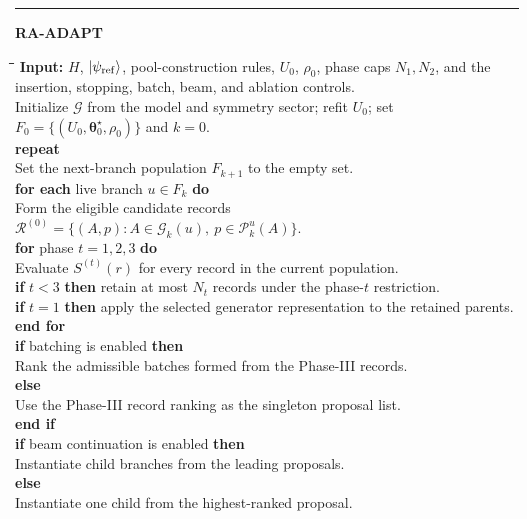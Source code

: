 \documentclass[
  reprint,
  amsmath,
  amssymb,
  aps,
  pra,
  nofootinbib,
  superscriptaddress,
  floatfix
]{revtex4-2}
\newcommand{\ket}[1]{|#1\rangle}
\begin{document}
\begin{widetext}
\footnotesize
\noindent\rule{\textwidth}{0.4pt}
\textbf{RA-ADAPT}
\begin{tabbing}
\hspace{1.5em}\=\hspace{1.5em}\=\hspace{1.5em}\=\hspace{1.5em}\=\kill
\textbf{Input:} \(H\), \(\ket{\psi_{\rm ref}}\), pool-construction rules, \(U_0\), \(\rho_0\), phase caps \(N_1,N_2\), and the insertion, stopping, batch, beam, and ablation controls.\\
Initialize \(\mathcal G\) from the model and symmetry sector; refit \(U_0\); set \(F_0=\{(U_0,\boldsymbol\theta_0^\star,\rho_0)\}\) and \(k=0\).\\
\textbf{repeat}\\
\>Set the next-branch population \(F_{k+1}\) to the empty set.\\
\>\textbf{for each} live branch \(u\in F_k\) \textbf{do}\\
\>\>Form the eligible candidate records\\
\>\>\(\displaystyle\mathcal R^{(0)}=
\{(A,p):A\in\mathcal G_k(u),\ p\in\mathcal P_k^u(A)\}\).\\
\>\>\textbf{for} phase \(t=1,2,3\) \textbf{do}\\
\>\>\>Evaluate \(S^{(t)}(r)\) for every record in the current population.\\
\>\>\>\textbf{if} \(t<3\) \textbf{then} retain at most \(N_t\) records under the phase-\(t\) restriction.\\
\>\>\>\textbf{if} \(t=1\) \textbf{then} apply the selected generator representation to the retained parents.\\
\>\>\textbf{end for}\\
\>\>\textbf{if} batching is enabled \textbf{then}\\
\>\>\>Rank the admissible batches formed from the Phase-III records.\\
\>\>\textbf{else}\\
\>\>\>Use the Phase-III record ranking as the singleton proposal list.\\
\>\>\textbf{end if}\\
\>\>\textbf{if} beam continuation is enabled \textbf{then}\\
\>\>\>Instantiate child branches from the leading proposals.\\
\>\>\textbf{else}\\
\>\>\>Instantiate one child from the highest-ranked proposal.\\

\end{tabbing}
\end{widetext}
\end{document}
